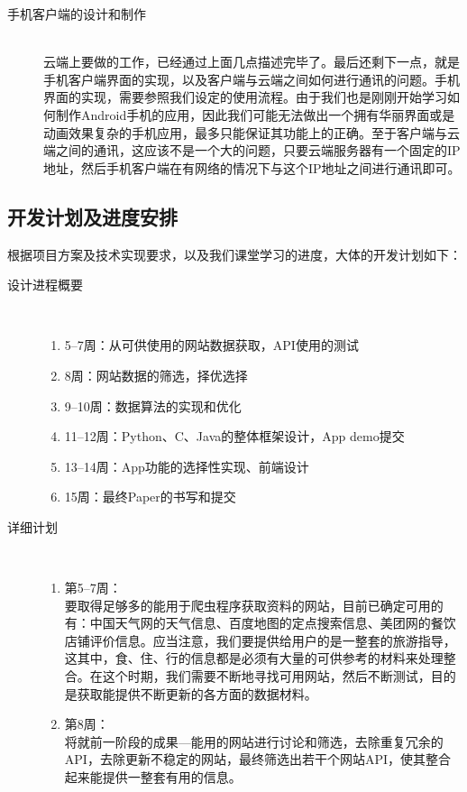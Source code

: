 \documentclass[12pt,a4paper]{article}
\begin{document}
\begin{CJK}{UTF8}{gbsn}
\begin{description}
	\item[手机客户端的设计和制作] \hfill \\
	云端上要做的工作，已经通过上面几点描述完毕了。最后还剩下一点，就是手机客户端界面的实现，以及客户端与云端之间如何进行通讯的问题。手机界面的实现，需要参照我们设定的使用流程。由于我们也是刚刚开始学习如何制作Android手机的应用，因此我们可能无法做出一个拥有华丽界面或是动画效果复杂的手机应用，最多只能保证其功能上的正确。至于客户端与云端之间的通讯，这应该不是一个大的问题，只要云端服务器有一个固定的IP地址，然后手机客户端在有网络的情况下与这个IP地址之间进行通讯即可。
	\end{description}

	\subsection{开发计划及进度安排}
	根据项目方案及技术实现要求，以及我们课堂学习的进度，大体的开发计划如下：
	\begin{description}
	\item[设计进程概要] \hfill \\
		\begin{enumerate}
		\item	5--7周：从可供使用的网站数据获取，API使用的测试
		\item	8周：网站数据的筛选，择优选择
		\item	9--10周：数据算法的实现和优化
		\item	11--12周：Python、C、Java的整体框架设计，App demo提交
		\item	13--14周：App功能的选择性实现、前端设计
		\item	15周：最终Paper的书写和提交
		\end{enumerate}
	\item[详细计划] \hfill \\
	\begin{enumerate}
	\item 第5--7周：\\
	要取得足够多的能用于爬虫程序获取资料的网站，目前已确定可用的有：中国天气网的天气信息、百度地图的定点搜索信息、美团网的餐饮店铺评价信息。应当注意，我们要提供给用户的是一整套的旅游指导，这其中，食、住、行的信息都是必须有大量的可供参考的材料来处理整合。在这个时期，我们需要不断地寻找可用网站，然后不断测试，目的是获取能提供不断更新的各方面的数据材料。\\
	\item 第8周：\\
	将就前一阶段的成果---能用的网站进行讨论和筛选，去除重复冗余的API，去除更新不稳定的网站，最终筛选出若干个网站API，使其整合起来能提供一整套有用的信息。\\

\end{enumerate}
\end{description}
\end{CJK}
\end{document}
